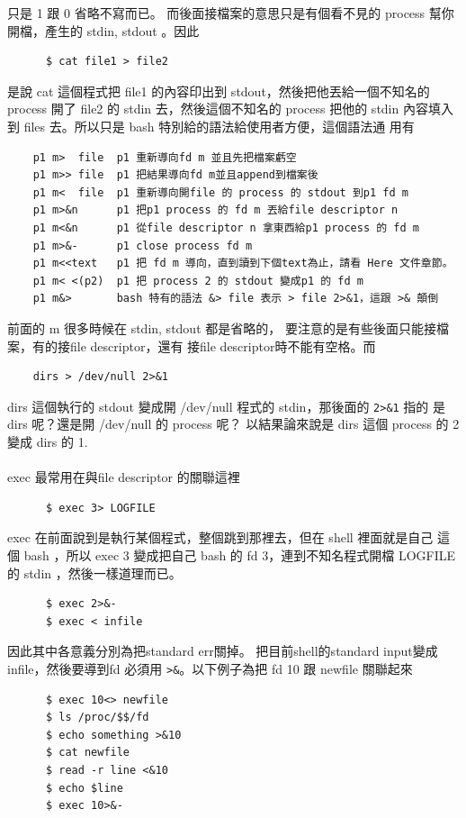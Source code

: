     只是 1 跟 0 省略不寫而已。 而後面接檔案的意思只是有個看不見的 process
    幫你開檔，產生的 stdin, stdout 。因此
    \begin{verbatim}
      $ cat file1 > file2
    \end{verbatim}
    是說 cat 這個程式把 file1 的內容印出到 stdout，然後把他丟給一個不知名的
    process 開了 file2 的 stdin 去，然後這個不知名的 process 把他的 stdin
    內容填入到 files 去。所以只是 bash 特別給的語法給使用者方便，這個語法通
    用有
    \begin{verbatim}
    p1 m>  file  p1 重新導向fd m 並且先把檔案虧空
    p1 m>> file  p1 把結果導向fd m並且append到檔案後
    p1 m<  file  p1 重新導向開file 的 process 的 stdout 到p1 fd m
    p1 m>&n      p1 把p1 process 的 fd m 丟給file descriptor n
    p1 m<&n      p1 從file descriptor n 拿東西給p1 process 的 fd m
    p1 m>&-      p1 close process fd m
    p1 m<<text   p1 把 fd m 導向，直到讀到下個text為止，請看 Here 文件章節。
    p1 m< <(p2)  p1 把 process 2 的 stdout 變成p1 的 fd m
    p1 m&>       bash 特有的語法 &> file 表示 > file 2>&1，這跟 >& 顛倒
    \end{verbatim}
    前面的 m 很多時候在 stdin, stdout 都是省略的，
    要注意的是有些後面只能接檔案，有的接file descriptor，還有
    接file descriptor時不能有空格。而
    \begin{verbatim}
    dirs > /dev/null 2>&1
    \end{verbatim}
    dirs 這個執行的 stdout 變成開 /dev/null 程式的 stdin，那後面的
    \verb=2>&1= 指的 是 dirs 呢？還是開 /dev/null 的 process 呢？
    以結果論來說是 dirs 這個 process 的 2 變成 dirs 的 1.
    \\\\
    exec 最常用在與file descriptor 的關聯這裡
    \begin{verbatim}
      $ exec 3> LOGFILE
    \end{verbatim}
    exec 在前面說到是執行某個程式，整個跳到那裡去，但在 shell 裡面就是自己
    這個 bash ，所以 exec 3 變成把自己 bash 的 fd 3，連到不知名程式開檔
    LOGFILE 的 stdin ，然後一樣道理而已。
    \begin{verbatim}
      $ exec 2>&-
      $ exec < infile
    \end{verbatim}
    因此其中各意義分別為把standard err關掉。 把目前shell的standard input變成
    infile，然後要導到fd 必須用 \verb=>&=。以下例子為把 fd 10 跟 newfile
    關聯起來
    \begin{verbatim}
      $ exec 10<> newfile
      $ ls /proc/$$/fd
      $ echo something >&10
      $ cat newfile
      $ read -r line <&10
      $ echo $line
      $ exec 10>&-
    \end{verbatim}
